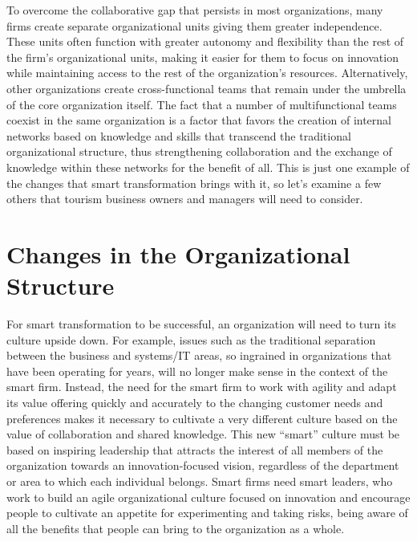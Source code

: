 \documentclass[
  letterpaper,
  DIV=11,
  numbers=noendperiod]{scrreprt}
\begin{document}
To overcome the collaborative gap that persists in most organizations,
many firms create separate organizational units giving them greater
independence. These units often function with greater autonomy and
flexibility than the rest of the firm's organizational units, making it
easier for them to focus on innovation while maintaining access to the
rest of the organization's resources. Alternatively, other organizations
create cross-functional teams that remain under the umbrella of the core
organization itself. The fact that a number of multifunctional teams
coexist in the same organization is a factor that favors the creation of
internal networks based on knowledge and skills that transcend the
traditional organizational structure, thus strengthening collaboration
and the exchange of knowledge within these networks for the benefit of
all. This is just one example of the changes that smart transformation
brings with it, so let's examine a few others that tourism business
owners and managers will need to consider.

\hypertarget{changes-in-the-organizational-structure}{%
\section{Changes in the Organizational
Structure}\label{changes-in-the-organizational-structure}}

For smart transformation to be successful, an organization will need to
turn its culture upside down. For example, issues such as the
traditional separation between the business and systems/IT areas, so
ingrained in organizations that have been operating for years, will no
longer make sense in the context of the smart firm. Instead, the need
for the smart firm to work with agility and adapt its value offering
quickly and accurately to the changing customer needs and preferences
makes it necessary to cultivate a very different culture based on the
value of collaboration and shared knowledge. This new ``smart'' culture
must be based on inspiring leadership that attracts the interest of all
members of the organization towards an innovation-focused vision,
regardless of the department or area to which each individual belongs.
Smart firms need smart leaders, who work to build an agile
organizational culture focused on innovation and encourage people to
cultivate an appetite for experimenting and taking risks, being aware of
all the benefits that people can bring to the organization as a whole.
\end{document}
